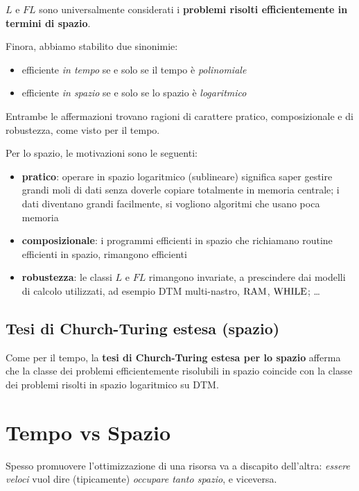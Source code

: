 $L$ e $FL$ sono universalmente considerati i \textbf{problemi risolti efficientemente in termini di spazio}.

Finora, abbiamo stabilito due sinonimie:
\begin{itemize}
	\item efficiente \textit{in tempo} se e solo se il tempo è \textit{polinomiale}
	\item efficiente \textit{in spazio} se e solo se lo spazio è \textit{logaritmico}
\end{itemize}

Entrambe le affermazioni trovano ragioni di carattere pratico, composizionale e di robustezza, come visto per il tempo.

Per lo spazio, le motivazioni sono le seguenti:
\begin{itemize}
	\item \textbf{pratico}: operare in spazio logaritmico (sublineare) significa saper gestire grandi moli di dati senza doverle copiare totalmente in memoria centrale; i dati diventano grandi facilmente, si vogliono algoritmi che usano poca memoria 
	\item \textbf{composizionale}: i programmi efficienti in spazio che richiamano routine efficienti in spazio, rimangono efficienti
	\item \textbf{robustezza}: le classi $L$ e $FL$ rimangono invariate, a prescindere dai modelli di calcolo utilizzati, ad esempio DTM multi-nastro, $\text{RAM}$, $\text{WHILE}$; \dots
\end{itemize}

\subsection{Tesi di Church-Turing estesa (spazio)}

Come per il tempo, la \textbf{tesi di Church-Turing estesa per lo spazio} afferma che la classe dei problemi efficientemente risolubili in spazio coincide con la classe dei problemi risolti in spazio logaritmico su DTM. 

\section{Tempo vs Spazio}

Spesso promuovere l'ottimizzazione di una risorsa va a discapito dell'altra: \textit{essere veloci} vuol dire (tipicamente) \textit{occupare tanto spazio}, e viceversa.

